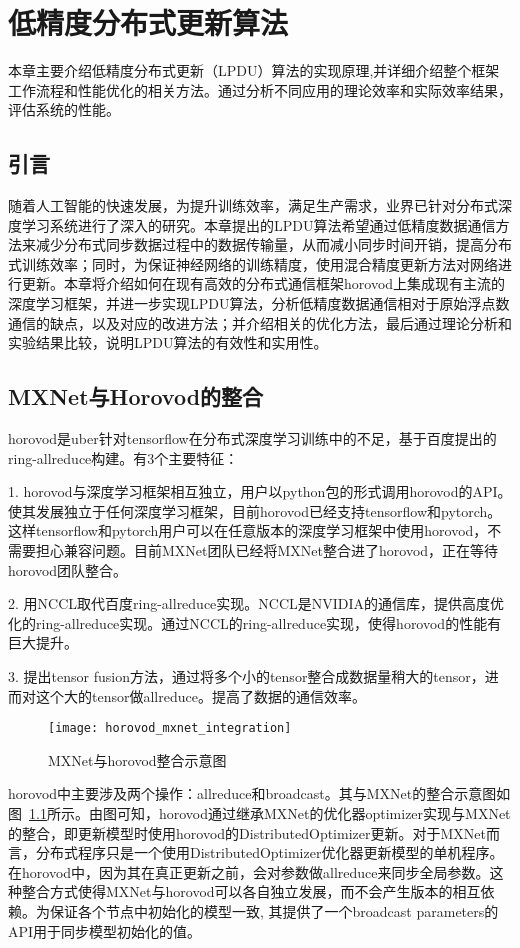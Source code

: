 \chapter{低精度分布式更新算法}
本章主要介绍低精度分布式更新（LPDU）算法的实现原理,并详细介绍整个框架工作流程和性能优化的相关方法。通过分析不同应用的理论效率和实际效率结果，评估系统的性能。
\section{引言}
随着人工智能的快速发展，为提升训练效率，满足生产需求，业界已针对分布式深度学习系统进行了深入的研究。本章提出的LPDU算法希望通过低精度数据通信方法来减少分布式同步数据过程中的数据传输量，从而减小同步时间开销，提高分布式训练效率；同时，为保证神经网络的训练精度，使用混合精度更新方法对网络进行更新。本章将介绍如何在现有高效的分布式通信框架horovod上集成现有主流的深度学习框架，并进一步实现LPDU算法，分析低精度数据通信相对于原始浮点数通信的缺点，以及对应的改进方法；并介绍相关的优化方法，最后通过理论分析和实验结果比较，说明LPDU算法的有效性和实用性。
\section{MXNet与Horovod的整合}
horovod是uber针对tensorflow在分布式深度学习训练中的不足，基于百度提出的ring-allreduce构建。有3个主要特征：

1. horovod与深度学习框架相互独立，用户以python包的形式调用horovod的API。使其发展独立于任何深度学习框架，目前horovod已经支持tensorflow和pytorch。这样tensorflow和pytorch用户可以在任意版本的深度学习框架中使用horovod，不需要担心兼容问题。目前MXNet团队已经将MXNet整合进了horovod，正在等待horovod团队整合。

2. 用NCCL取代百度ring-allreduce实现。NCCL是NVIDIA的通信库，提供高度优化的ring-allreduce实现。通过NCCL的ring-allreduce实现，使得horovod的性能有巨大提升。

3. 提出tensor fusion方法，通过将多个小的tensor整合成数据量稍大的tensor，进而对这个大的tensor做allreduce。提高了数据的通信效率。

\begin{figure}[htp]
\centering
\texttt{[image: horovod\_mxnet\_integration]}
\caption{MXNet与horovod整合示意图}
\label{fig:horovod_mxnet_integration}
\end{figure}
horovod中主要涉及两个操作：allreduce和broadcast。其与MXNet的整合示意图如图~\ref{fig:horovod_mxnet_integration}所示。由图可知，horovod通过继承MXNet的优化器optimizer实现与MXNet的整合，即更新模型时使用horovod的DistributedOptimizer更新。对于MXNet而言，分布式程序只是一个使用DistributedOptimizer优化器更新模型的单机程序。在horovod中，因为其在真正更新之前，会对参数做allreduce来同步全局参数。这种整合方式使得MXNet与horovod可以各自独立发展，而不会产生版本的相互依赖。为保证各个节点中初始化的模型一致, 其提供了一个broadcast parameters的API用于同步模型初始化的值。

